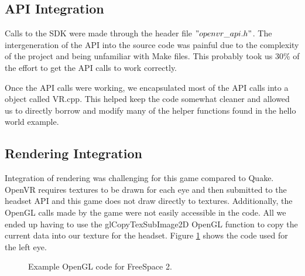 \documentclass[journal]{IEEEtran}
\begin{document}
\begin{figure}[h!]
	\noindent
\end{figure}


\subsection{API Integration}
Calls to the SDK were made through the header file $"openvr\_api.h"$. The intergeneration of the API into the source code was painful due to the complexity of the project and being unfamiliar with Make files. This probably took us 30\% of the effort to get the API calls to work correctly. 

Once the API calls were working, we encapsulated most of the API calls into a object called VR.cpp. This helped keep the code somewhat cleaner and allowed us to directly borrow and modify many of the helper functions found in the hello world example.

\subsection{Rendering Integration}
Integration of rendering was challenging for this game compared to Quake. OpenVR requires textures to be drawn for each eye and then submitted to the headset API and this game does not draw directly to textures. Additionally, the OpenGL calls made by the game were not easily accessible in the code. All we ended up having to use the glCopyTexSubImage2D OpenGL function to copy the current data into our texture for the headset. Figure \ref{freespace_render} shows the code used for the left eye. 

\begin{figure}[h]
	\noindent
	
	\caption{Example OpenGL code for FreeSpace 2.  \label{freespace_render}
	}
\end{figure}
\end{document}
